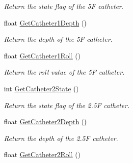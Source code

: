 \begin{DoxyCompactItemize}
\begin{DoxyCompactList}\small\item\em Return the state flag of the 5F catheter. \item\end{DoxyCompactList}\item 
\hypertarget{classvtkVSP_a00f912f5e3a6b995341ea59712a09609}{
float \hyperlink{classvtkVSP_a00f912f5e3a6b995341ea59712a09609}{GetCatheter1Depth} ()}
\label{classvtkVSP_a00f912f5e3a6b995341ea59712a09609}

\begin{DoxyCompactList}\small\item\em Return the depth of the 5F catheter. \item\end{DoxyCompactList}\item 
\hypertarget{classvtkVSP_a2bd0656b6943f372082c6a60abd1ea8f}{
float \hyperlink{classvtkVSP_a2bd0656b6943f372082c6a60abd1ea8f}{GetCatheter1Roll} ()}
\label{classvtkVSP_a2bd0656b6943f372082c6a60abd1ea8f}

\begin{DoxyCompactList}\small\item\em Return the roll value of the 5F catheter. \item\end{DoxyCompactList}\item 
\hypertarget{classvtkVSP_a9ffc93c092f6c0dd4a217f221eaa2056}{
int \hyperlink{classvtkVSP_a9ffc93c092f6c0dd4a217f221eaa2056}{GetCatheter2State} ()}
\label{classvtkVSP_a9ffc93c092f6c0dd4a217f221eaa2056}

\begin{DoxyCompactList}\small\item\em Return the state flag of the 2.5F catheter. \item\end{DoxyCompactList}\item 
\hypertarget{classvtkVSP_a562a02d929ce09aa856167257bcd0381}{
float \hyperlink{classvtkVSP_a562a02d929ce09aa856167257bcd0381}{GetCatheter2Depth} ()}
\label{classvtkVSP_a562a02d929ce09aa856167257bcd0381}

\begin{DoxyCompactList}\small\item\em Return the depth of the 2.5F catheter. \item\end{DoxyCompactList}\item 
\hypertarget{classvtkVSP_afc01854a1a1f7dffaf0e6563eda84119}{
float \hyperlink{classvtkVSP_afc01854a1a1f7dffaf0e6563eda84119}{GetCatheter2Roll} ()}
\label{classvtkVSP_afc01854a1a1f7dffaf0e6563eda84119}


\end{DoxyCompactItemize}
